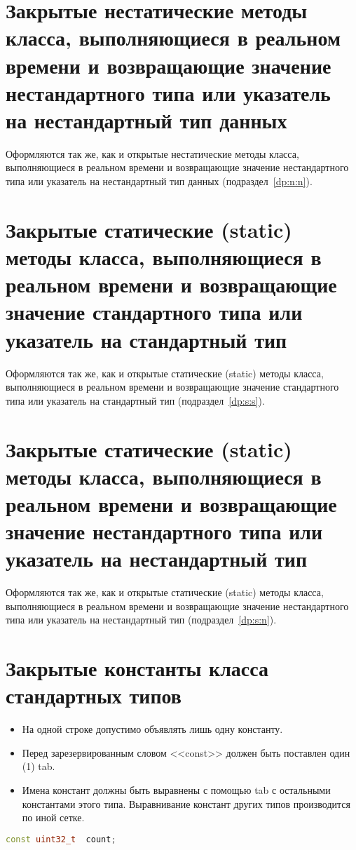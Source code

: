 \section{Закрытые нестатические методы класса, выполняющиеся в реальном времени и возвращающие значение нестандартного типа или указатель на нестандартный тип данных}\label{zp:n:n}
Оформляются так же, как и открытые нестатические методы класса, выполняющиеся в реальном времени и возвращающие значение нестандартного типа или указатель на нестандартный тип данных (подраздел~\ref{dp:n:n}).

\section{Закрытые статические (static) методы класса, выполняющиеся в реальном времени и возвращающие значение стандартного типа или указатель на стандартный тип}\label{zp:s:s}
Оформляются так же, как и открытые статические (static) методы класса, выполняющиеся в реальном времени и возвращающие значение стандартного типа или указатель на стандартный тип (подраздел~\ref{dp:s:s}).

\section{Закрытые статические (static) методы класса, выполняющиеся в реальном времени и возвращающие значение нестандартного типа или указатель на нестандартный тип}\label{zp:s:n}
Оформляются так же, как и открытые статические (static) методы класса, выполняющиеся в реальном времени и возвращающие значение нестандартного типа или указатель на нестандартный тип (подраздел~\ref{dp:s:n}).

\section{Закрытые константы класса стандартных типов}\label{zp:const:s}
\begin{itemize}
	\item На одной строке допустимо объявлять лишь одну константу.
	\item Перед зарезервированным словом <<const>> должен быть поставлен один (1) tab.
	\item Имена констант должны быть выравнены с помощью tab с остальными константами этого типа. Выравнивание констант других типов производится по иной сетке.
\end{itemize}\begin{lstlisting}[language=C++, frame=tlBR, basicstyle=\fontsize{10}{10}\ttfamily]
	const uint32_t	count;
\end{lstlisting}

